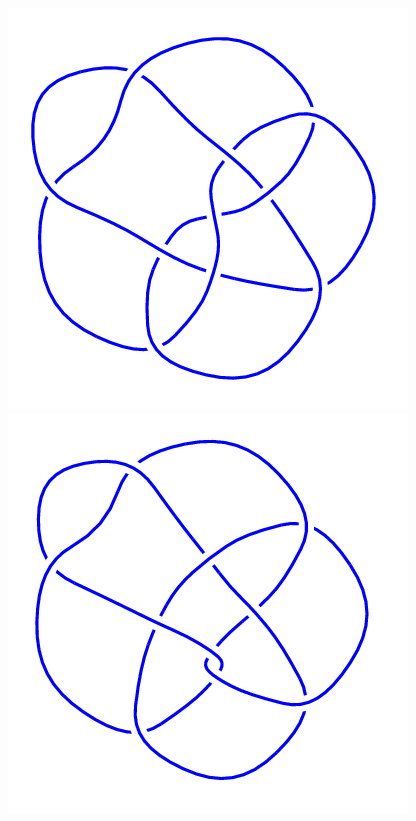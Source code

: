 \begin{figure}[H]
\begin{minipage}[b]{.18\linewidth}
    \end{minipage}
    \begin{minipage}[b]{.18\linewidth}
        \centering
        \includegraphics[width=\linewidth]{../data/10_164.png}
    \end{minipage}
    \begin{minipage}[b]{.18\linewidth}
        \centering
        \includegraphics[width=\linewidth]{../data/10_165.png}
    \end{minipage}
\end{figure}